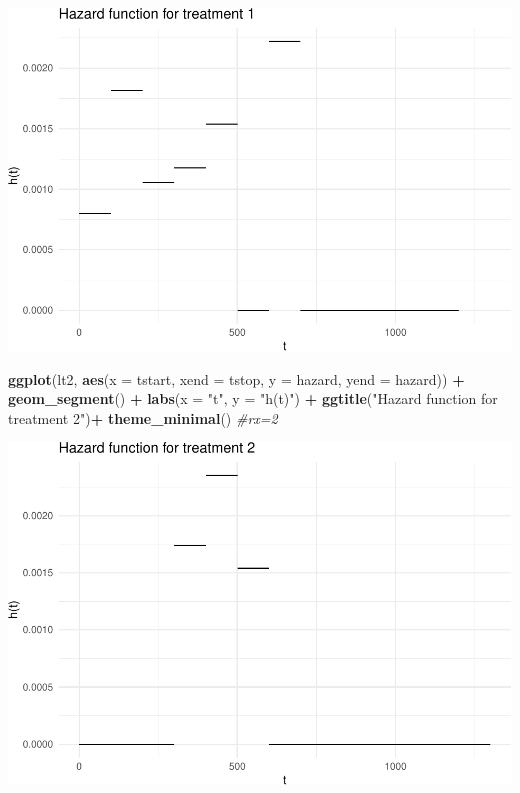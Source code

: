 \documentclass[
]{article}
\newenvironment{Shaded}{\begin{snugshade}}{\end{snugshade}}
\newcommand{\AttributeTok}[1]{\textcolor[rgb]{0.13,0.29,0.53}{#1}}
\newcommand{\CommentTok}[1]{\textcolor[rgb]{0.56,0.35,0.01}{\textit{#1}}}
\newcommand{\FunctionTok}[1]{\textcolor[rgb]{0.13,0.29,0.53}{\textbf{#1}}}
\newcommand{\NormalTok}[1]{#1}
\newcommand{\SpecialCharTok}[1]{\textcolor[rgb]{0.81,0.36,0.00}{\textbf{#1}}}
\newcommand{\StringTok}[1]{\textcolor[rgb]{0.31,0.60,0.02}{#1}}
\begin{document}
\includegraphics{HW3_files/figure-latex/unnamed-chunk-3-1.pdf}

\begin{Shaded}
\begin{Highlighting}[]
\FunctionTok{ggplot}\NormalTok{(lt2, }\FunctionTok{aes}\NormalTok{(}\AttributeTok{x =}\NormalTok{ tstart, }\AttributeTok{xend =}\NormalTok{ tstop, }\AttributeTok{y =}\NormalTok{ hazard, }\AttributeTok{yend =}\NormalTok{ hazard)) }\SpecialCharTok{+}
  \FunctionTok{geom\_segment}\NormalTok{() }\SpecialCharTok{+}
  \FunctionTok{labs}\NormalTok{(}\AttributeTok{x =} \StringTok{"t"}\NormalTok{, }\AttributeTok{y =} \StringTok{"h(t)"}\NormalTok{) }\SpecialCharTok{+}
  \FunctionTok{ggtitle}\NormalTok{(}\StringTok{"Hazard function for treatment 2"}\NormalTok{)}\SpecialCharTok{+}
  \FunctionTok{theme\_minimal}\NormalTok{() }\CommentTok{\#rx=2}
\end{Highlighting}
\end{Shaded}

\includegraphics{HW3_files/figure-latex/unnamed-chunk-3-2.pdf}
\end{document}
